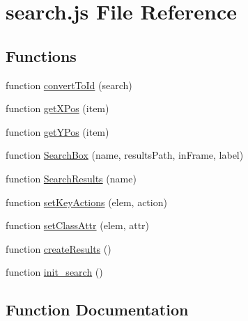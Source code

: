 \hypertarget{docs_2_programmer's_manual_2html_2search_2search_8js}{}\section{search.\+js File Reference}
\label{docs_2_programmer's_manual_2html_2search_2search_8js}
\subsection*{Functions}
\begin{DoxyCompactItemize}
\item 
function \hyperlink{docs_2_programmer's_manual_2html_2search_2search_8js_a196a29bd5a5ee7cd5b485e0753a49e57}{convert\+To\+Id} (search)
\item 
function \hyperlink{docs_2_programmer's_manual_2html_2search_2search_8js_a76d24aea0009f892f8ccc31d941c0a2b}{get\+X\+Pos} (item)
\item 
function \hyperlink{docs_2_programmer's_manual_2html_2search_2search_8js_a8d7b405228661d7b6216b6925d2b8a69}{get\+Y\+Pos} (item)
\item 
function \hyperlink{docs_2_programmer's_manual_2html_2search_2search_8js_a52066106482f8136aa9e0ec859e8188f}{Search\+Box} (name, results\+Path, in\+Frame, label)
\item 
function \hyperlink{docs_2_programmer's_manual_2html_2search_2search_8js_a9189b9f7a32b6bc78240f40348f7fe03}{Search\+Results} (name)
\item 
function \hyperlink{docs_2_programmer's_manual_2html_2search_2search_8js_a98192fa2929bb8e4b0a890a4909ab9b2}{set\+Key\+Actions} (elem, action)
\item 
function \hyperlink{docs_2_programmer's_manual_2html_2search_2search_8js_a499422fc054a5278ae32801ec0082c56}{set\+Class\+Attr} (elem, attr)
\item 
function \hyperlink{docs_2_programmer's_manual_2html_2search_2search_8js_a6b2c651120de3ed1dcf0d85341d51895}{create\+Results} ()
\item 
function \hyperlink{docs_2_programmer's_manual_2html_2search_2search_8js_ae95ec7d5d450d0a8d6928a594798aaf4}{init\+\_\+search} ()
\end{DoxyCompactItemize}


\subsection{Function Documentation}
\hypertarget{docs_2_programmer's_manual_2html_2search_2search_8js_a196a29bd5a5ee7cd5b485e0753a49e57}{}
